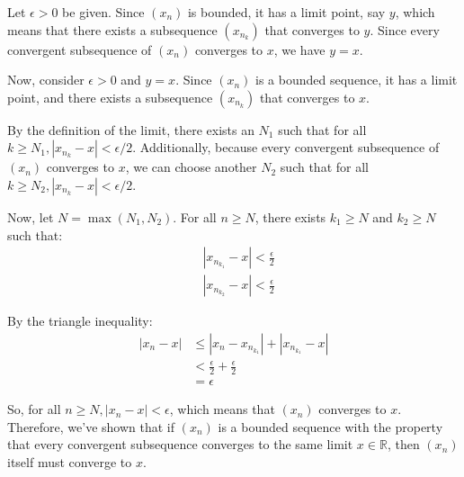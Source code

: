 \documentclass{report}
\begin{document}
\pagebreak



Let $\epsilon>0$ be given. Since $\left(x_n\right)$ is bounded, it has a limit point, say $y$, which means that there exists a subsequence $\left(x_{n_k}\right)$ that converges to $y$. Since every convergent subsequence of $\left(x_n\right)$ converges to $x$, we have $y=x$.

Now, consider $\epsilon>0$ and $y=x$. Since $\left(x_n\right)$ is a bounded sequence, it has a limit point, and there exists a subsequence $\left(x_{n_k}\right)$ that converges to $x$.

By the definition of the limit, there exists an $N_1$ such that for all $k \geq N_1,\left|x_{n_{k}}-x\right|<\epsilon / 2$.
Additionally, because every convergent subsequence of $\left(x_n\right)$ converges to $x$, we can choose another $N_2$ such that for all $k \geq N_2,\left|x_{n_k}-x\right|<\epsilon / 2$.

Now, let $N=\max \left(N_1, N_2\right)$. For all $n \geq N$, there exists $k_1 \geq N$ and $k_2 \geq N$ such that:
$$
\begin{aligned}
& \left|x_{n_{k_1}}-x\right|<\frac{\epsilon}{2} \\
& \left|x_{n_{k_2}}-x\right|<\frac{\epsilon}{2}
\end{aligned}
$$

By the triangle inequality:
$$
\begin{aligned}
\left|x_n-x\right| & \leq\left|x_n-x_{n_{k_1}}\right|+\left|x_{n_{k_1}}-x\right| \\
& <\frac{\epsilon}{2}+\frac{\epsilon}{2} \\
& =\epsilon
\end{aligned}
$$

So, for all $n \geq N,\left|x_n-x\right|<\epsilon$, which means that $\left(x_n\right)$ converges to $x$.
Therefore, we've shown that if $\left(x_n\right)$ is a bounded sequence with the property that every convergent subsequence converges to the same limit $x \in \mathbb{R}$, then $\left(x_n\right)$ itself must converge to $x$.
\end{document}

